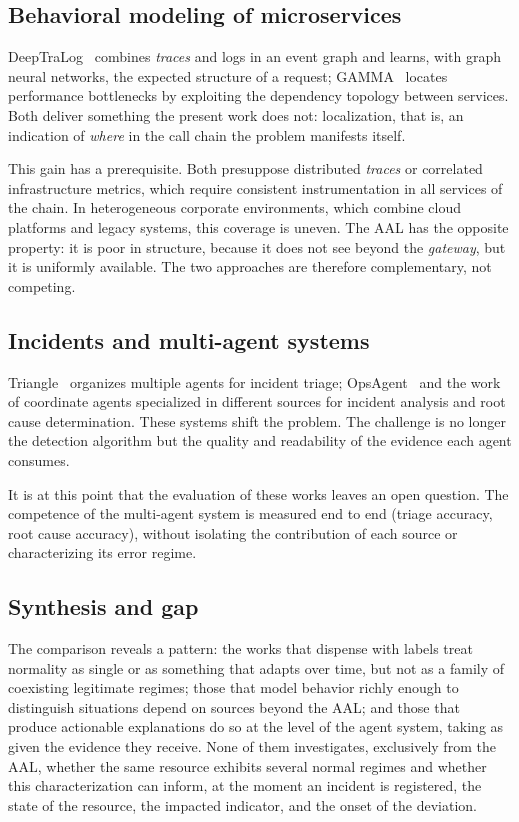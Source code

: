 \documentclass[sigconf,nonacm]{acmart}
\begin{document}
\subsection{Behavioral modeling of microservices}
DeepTraLog~\citep{zhang2022deeptralog} combines \emph{traces} and logs in an event graph and learns, with graph neural networks, the expected structure of a request; GAMMA~\citep{somashekar2024gamma} locates performance bottlenecks by exploiting the dependency topology between services. Both deliver something the present work does not: localization, that is, an indication of \emph{where} in the call chain the problem manifests itself.

This gain has a prerequisite. Both presuppose distributed \emph{traces} or correlated infrastructure metrics, which require consistent instrumentation in all services of the chain. In heterogeneous corporate environments, which combine cloud platforms and legacy systems, this coverage is uneven. The AAL has the opposite property: it is poor in structure, because it does not see beyond the \emph{gateway}, but it is uniformly available. The two approaches are therefore complementary, not competing.


\subsection{Incidents and multi-agent systems}
Triangle~\citep{yu2025triangle} organizes multiple agents for incident triage; OpsAgent~\citep{luo2025opsagent} and the work of \citet{kataria2025isre} coordinate agents specialized in different sources for incident analysis and root cause determination. These systems shift the problem. The challenge is no longer the detection algorithm but the quality and readability of the evidence each agent consumes.

It is at this point that the evaluation of these works leaves an open question. The competence of the multi-agent system is measured end to end (triage accuracy, root cause accuracy), without isolating the contribution of each source or characterizing its error regime.

\subsection{Synthesis and gap}
The comparison reveals a pattern: the works that dispense with labels treat normality as single or as something that adapts over time, but not as a family of coexisting legitimate regimes; those that model behavior richly enough to distinguish situations depend on sources beyond the AAL; and those that produce actionable explanations do so at the level of the agent system, taking as given the evidence they receive. None of them investigates, exclusively from the AAL, whether the same resource exhibits several normal regimes and whether this characterization can inform, at the moment an incident is registered, the state of the resource, the impacted indicator, and the onset of the deviation.
\end{document}
